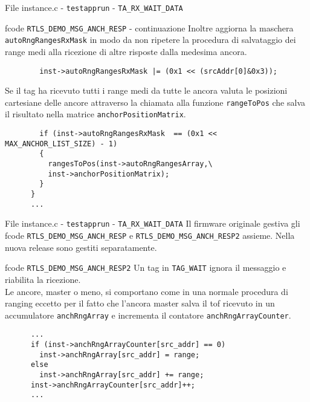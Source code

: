 \begin{frame}[fragile, shrink=15]{File instance.c - \lstinline!testapprun! - \lstinline!TA_RX_WAIT_DATA!}
  \begin{block}{fcode \lstinline!RTLS_DEMO_MSG_ANCH_RESP! - continuazione}
    Inoltre aggiorna la maschera \lstinline!autoRngRangesRxMask! in modo da non ripetere
    la procedura di salvataggio dei range medi alla ricezione di altre risposte dalla medesima ancora.
    \begin{lstlisting}
        inst->autoRngRangesRxMask |= (0x1 << (srcAddr[0]&0x3));
    \end{lstlisting}
    Se il tag ha ricevuto tutti i range medi da tutte le ancora valuta le posizioni cartesiane
    delle ancore attraverso la chiamata alla funzione \lstinline!rangeToPos! che salva il risultato
    nella matrice \lstinline!anchorPositionMatrix!.
    \begin{lstlisting}
        if (inst->autoRngRangesRxMask  == (0x1 << MAX_ANCHOR_LIST_SIZE) - 1)
        {
          rangesToPos(inst->autoRngRangesArray,\
          inst->anchorPositionMatrix);
        }
      }
      ...
    \end{lstlisting}
  \end{block}
\end{frame}

\begin{frame}[fragile, shrink=15]{File instance.c - \lstinline!testapprun! - \lstinline!TA_RX_WAIT_DATA!}
  Il firmware originale gestiva gli fcode \lstinline!RTLS_DEMO_MSG_ANCH_RESP! e
  \lstinline!RTLS_DEMO_MSG_ANCH_RESP2! assieme. Nella nuova release sono gestiti separatamente.
  \begin{block}{fcode \lstinline!RTLS_DEMO_MSG_ANCH_RESP2!}
    Un tag in \lstinline!TAG_WAIT! ignora il messaggio e riabilita la ricezione.\\
    Le ancore, master o meno, si comportano come in una normale procedura di ranging
    eccetto per il fatto che l'ancora master salva il tof ricevuto in un accumulatore
    \lstinline!anchRngArray! e incrementa il contatore \lstinline!anchRngArrayCounter!.
    \begin{lstlisting}
      ...
      if (inst->anchRngArrayCounter[src_addr] == 0)
        inst->anchRngArray[src_addr] = range;
      else 
        inst->anchRngArray[src_addr] += range;
      inst->anchRngArrayCounter[src_addr]++;
      ...
    \end{lstlisting}
  \end{block}
\end{frame}

